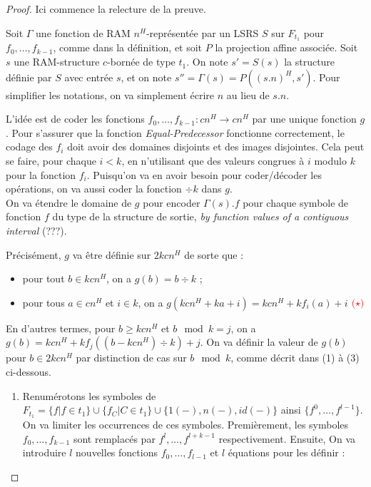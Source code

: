 \documentclass{article}
\begin{document}
		\begin{proof}
			Ici commence la relecture de la preuve.
			
			Soit $\Gamma$ une fonction de RAM $n^H$-représentée par un LSRS $S$ sur $F_{t_1}$ pour $f_0, \dots, f_{k-1}$, comme dans la définition, et soit $P$ la projection affine associée. Soit $s$ une RAM-structure $c$-bornée de type $t_1$. On note $s' = S(s)$ la structure définie par $S$ avec entrée $s$, et on note $s'' = \Gamma(s) = P\left( (s.n)^H, s'\right)$. Pour simplifier les notations, on va simplement écrire $n$ au lieu de $s.n$.
			
			L'idée est de coder les fonctions $f_0, \dots, f_{k-1} : cn^H \to cn^H$ par une unique fonction $g$. Pour s'assurer que la fonction \emph{Equal-Predecessor} fonctionne correctement, le codage des $f_i$ doit avoir des domaines disjoints et des images disjointes. Cela peut se faire, pour chaque $i<k$, en n'utilisant que des valeurs congrues à $i$ modulo $k$ pour la fonction $f_i$. Puisqu'on va en avoir besoin pour coder/décoder les opérations, on va aussi coder la fonction $\div k$ dans $g$.\\
			
			On va étendre le domaine de $g$ pour encoder $\Gamma(s).f$ pour chaque symbole de fonction $f$ du type de la structure de sortie, \emph{by function values of a contiguous interval} (???).
			
			Précisément, $g$ va être définie sur $2kcn^H$ de sorte que :
			
			\begin{itemize}
				\setlength{\itemsep}{-1mm}
				\item	pour tout $b \in kcn^H$, on a $g(b) = b \div k$ ;
				\item 	pour tous $a \in cn^H$ et $i \in k$, on a $g\left( kcn^H + ka + i \right) = kcn^H + k f_i(a) + i$ $\textcolor{red}{(\star)}$
			\end{itemize}
			
			En d'autres termes, pour $b \geqslant kcn^H$ et $b \mod{k} = j$, on a $g(b) = kcn^H + k f_j\left( (b-kcn^H) \div k \right) + j$.
			On va définir la valeur de $g(b)$ pour $b \in 2kcn^H$ par distinction de cas sur $b \mod{k}$, comme décrit dans (1) à (3) ci-dessous.
			
			\begin{enumerate}[itemsep=-1mm,leftmargin=2cm]
				\item  
					Renumérotons les symboles de $F_{t_1} = \{f | f \in t_1\} \cup \{f_C | C \in t_1\} \cup \{1(-), n(-), id(-)\}$ ainsi $\{ f^0, \dots, f^{l-1} \}$. On va limiter les occurrences de ces symboles. Premièrement, les symboles $f_0, \dots, f_{k-1}$ sont remplacés par $f^{l}, \dots, f^{l+k-1}$ respectivement. Ensuite, On va introduire $l$ nouvelles fonctions $f_0, \dots, f_{l-1}$ et $l$ équations pour les définir :
					

\end{enumerate}
\end{proof}
\end{document}
